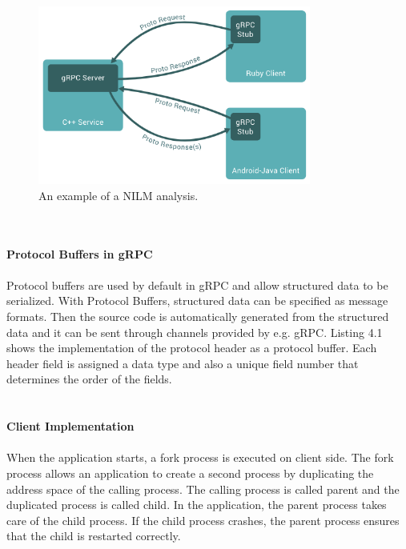 \begin{figure}[tbp]
  \centering
  \includegraphics[width=0.8\textwidth]{images/grpc.png}
  \caption[Short description]{An example of a NILM analysis.}
  \label{fig:Appliance_Model}
\end{figure}\\
\\
\textbf{Protocol Buffers in gRPC}
\\
\\
Protocol buffers are used by default in gRPC and allow structured data to be serialized. With Protocol Buffers, structured data can be specified as message formats. Then the source code is automatically generated from the structured data and it can be sent through channels provided by e.g. gRPC.
Listing 4.1 shows the implementation of the protocol header as a protocol buffer. Each header field is assigned a data type and also a unique field number that determines the order of the fields.\\
\\
\\
\textbf{Client Implementation}
\\
\\
When the application starts, a fork process is executed on client side. The fork process allows an application to create a second process by duplicating the address space of the calling process. The calling process is called parent and the duplicated process is called child. In the application, the parent process takes care of the child process. If the child process crashes, the parent process ensures that the child is restarted correctly. 
